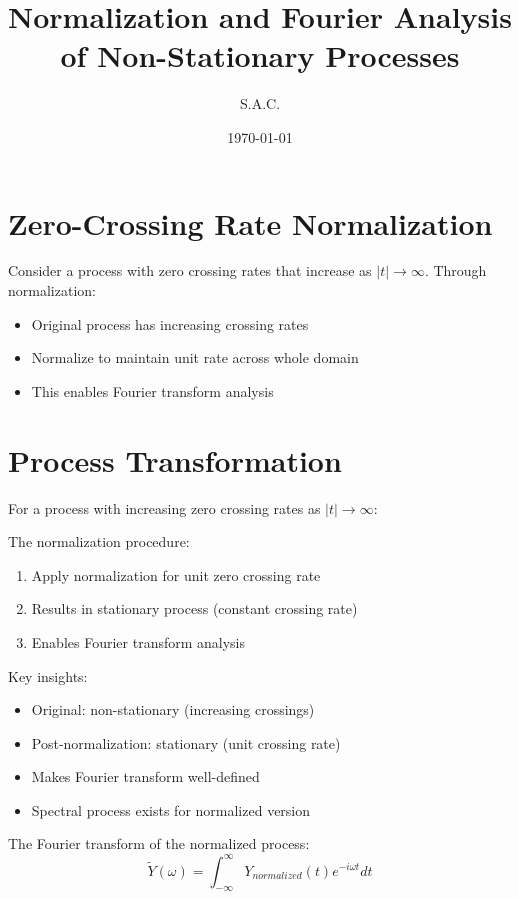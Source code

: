 \title{Normalization and Fourier Analysis of Non-Stationary Processes}
\author{S.A.C.}
\date{\today}


\maketitle

\section{Zero-Crossing Rate Normalization}
Consider a process with zero crossing rates that increase as $|t| \to \infty$. Through normalization:

\begin{itemize}
\item Original process has increasing crossing rates
\item Normalize to maintain unit rate across whole domain
\item This enables Fourier transform analysis
\end{itemize}

\section{Process Transformation}
For a process with increasing zero crossing rates as $|t| \to \infty$:

The normalization procedure:
\begin{enumerate}
\item Apply normalization for unit zero crossing rate
\item Results in stationary process (constant crossing rate)
\item Enables Fourier transform analysis
\end{enumerate}

Key insights:
\begin{itemize}
\item Original: non-stationary (increasing crossings)
\item Post-normalization: stationary (unit crossing rate)
\item Makes Fourier transform well-defined
\item Spectral process exists for normalized version
\end{itemize}

The Fourier transform of the normalized process:
\[ \tilde{Y}(\omega) = \int_{-\infty}^{\infty} Y_{normalized}(t)e^{-i\omega t}dt \]

